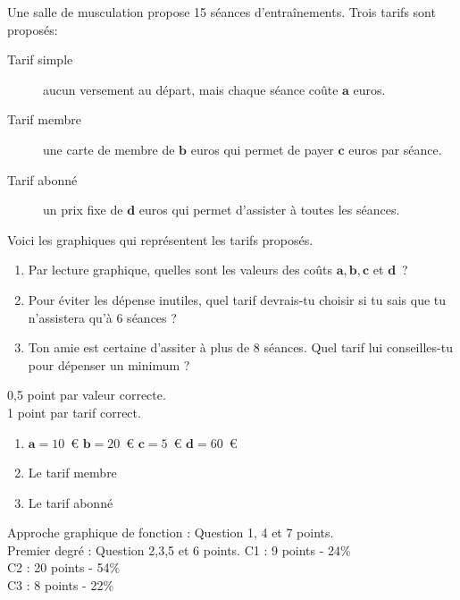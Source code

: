 \documentclass[a4paper, 12pt, parskip=half-]{scrartcl}
\begin{document}
\newpage
\begin{exercise}[points=4]
    Une salle de musculation propose 15 séances d'entraînements.
    Trois tarifs sont proposés:
    \begin{description}
        \item[Tarif simple] aucun versement au départ, mais chaque séance coûte $\bm{a}$ euros.
        \item[Tarif membre] une carte de membre de $\bm{b}$ euros qui permet de payer $\bm{c}$ euros par séance.
        \item[Tarif abonné] un prix fixe de $\bm{d}$ euros qui permet d'assister à toutes les séances.
    \end{description}
    Voici les graphiques qui représentent les tarifs proposés.
    \begin{center}
        
    \end{center}
    \begin{enumerate}[itemsep=1em]
        \item Par lecture graphique, quelles sont les valeurs des coûts $\bm{a}, \bm{b}, \bm{c}$ et $\bm{d}$~?
        \item Pour éviter les dépense inutiles, quel tarif devrais-tu choisir si tu sais que tu n'assistera qu'à 6 séances ?
        \item Ton amie est certaine d'assiter à plus de 8 séances. Quel tarif lui conseilles-tu pour dépenser un minimum ?
    \end{enumerate}
\end{exercise}
\begin{solution}
    0,5 point par valeur correcte.\\
    1 point par tarif correct.
    \begin{enumerate}
        \item $\bm{a} = 10$~€\hfill
              $\bm{b} = 20$~€\hfill
              $\bm{c} = 5$~€\hfill
              $\bm{d} = 60$~€
        \item Le tarif membre
        \item Le tarif abonné
    \end{enumerate}
\end{solution}
\newpage
\printsolutions
\bigbreak
{}
Approche graphique de fonction : Question 1, 4 et 7  points.\\
Premier degré : Question 2,3,5 et 6  points.
C1 : 9 points - 24\%\\
C2 : 20 points - 54\%\\
C3 : 8 points - 22\%
\end{document}
